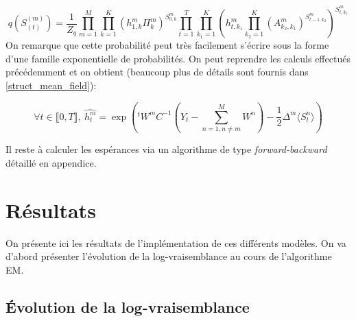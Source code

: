 \documentclass[10pt,a4paper]{article}
\newcommand{\EM}{\textsc{EM}}
\begin{document}
\begin{equation}
  q(S_{(t)}^{(m)}) = \frac{1}{Z_q} \underset{m=1}{\overset{M}{\prod}} 
  \underset{k=1}{\overset{K}{\prod}} \left( h_{1,k}^m \Pi_k^m \right)^{S_{0,k}^m} 
  \underset{t=1}{\overset{T}{\prod}} \underset{k_1=1}{\overset{K}{\prod}} 
  \left(h_{t,k_1}^m \underset{k_2=1}{\overset{K}{\prod}} \left( 
  A_{k_2,k_1}^m\right)^{S_{t-1,k_2}^m} \right)^{S_{t,k_1}^m}
\end{equation}
On remarque que cette probabilité peut très facilement s'écrire sous la forme 
d'une famille exponentielle de probabilités.
On peut reprendre les calculs effectués précédemment et on obtient (beaucoup plus de détails sont fournis dans \ref{struct_mean_field}):

\begin{equation}
\forall t \in \llbracket 0,T \rrbracket, \ \hat{h_t^m} = \exp \left( 
{}^tW^mC^{-1} \left( Y_t - \underset{n=1, n \neq m}{\overset{M}{\sum}} W^n 
\right) -\frac{1}{2} \Delta^m \langle S_t^n \rangle \right)
\end{equation}

Il reste à calculer les espérances via un algorithme de type \textit{forward-backward} détaillé en appendice.
\section{Résultats}
\label{results}

On présente ici les résultats de l'implémentation de ces différents modèles.  
On va d'abord présenter l'évolution de la log-vraisemblance au cours de 
l'algorithme \EM.
\subsection{Évolution de la log-vraisemblance}
\end{document}
